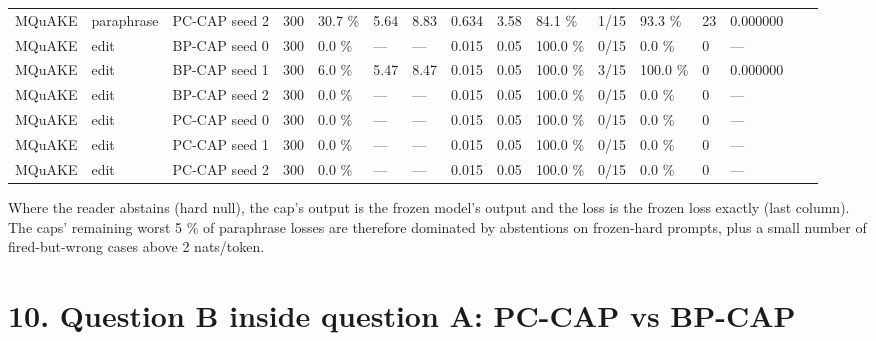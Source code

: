 \documentclass[10pt,a4paper]{article}
\begin{document}
\begin{center}
\begin{tabularx}{\textwidth}{@{}p{}XXXXXXXXXXXXXXX@{}}
MQuAKE & paraphrase & PC-CAP seed 2 & 300 & 30.7 \% & 5.64 & 8.83 & 0.634 & 3.58 & 84.1 \% & 1/15 & 93.3 \% & 23 & 0.000000 &  &  \\
MQuAKE & edit & BP-CAP seed 0 & 300 & 0.0 \% & — & — & 0.015 & 0.05 & 100.0 \% & 0/15 & 0.0 \% & 0 & — &  &  \\
MQuAKE & edit & BP-CAP seed 1 & 300 & 6.0 \% & 5.47 & 8.47 & 0.015 & 0.05 & 100.0 \% & 3/15 & 100.0 \% & 0 & 0.000000 &  &  \\
MQuAKE & edit & BP-CAP seed 2 & 300 & 0.0 \% & — & — & 0.015 & 0.05 & 100.0 \% & 0/15 & 0.0 \% & 0 & — &  &  \\
MQuAKE & edit & PC-CAP seed 0 & 300 & 0.0 \% & — & — & 0.015 & 0.05 & 100.0 \% & 0/15 & 0.0 \% & 0 & — &  &  \\
MQuAKE & edit & PC-CAP seed 1 & 300 & 0.0 \% & — & — & 0.015 & 0.05 & 100.0 \% & 0/15 & 0.0 \% & 0 & — &  &  \\
MQuAKE & edit & PC-CAP seed 2 & 300 & 0.0 \% & — & — & 0.015 & 0.05 & 100.0 \% & 0/15 & 0.0 \% & 0 & — &  &  \\
\bottomrule
\end{tabularx}
\end{center}



Where the reader abstains (hard null), the cap's output is the frozen model's output and the loss is the frozen loss exactly (last column). The caps' remaining worst 5 \% of paraphrase losses are therefore dominated by abstentions on frozen-hard prompts, plus a small number of fired-but-wrong cases above 2 nats/token.



\section*{10. Question B inside question A: PC-CAP vs BP-CAP}
\end{document}
